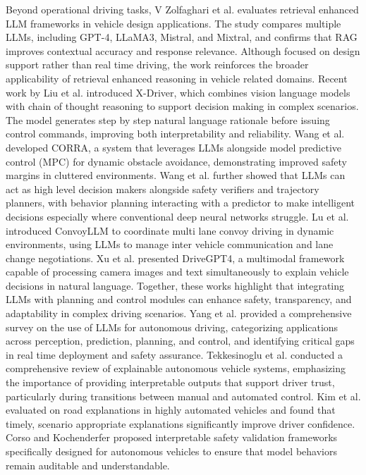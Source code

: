 \documentclass[a4paper,12pt,one side]{report}
\theoremstyle{definition}
\begin{document}
\begin{itemize}
Beyond operational driving tasks, V Zolfaghari et al. \cite{zolfaghari2024adopting} evaluates retrieval enhanced LLM frameworks in vehicle design applications. The study compares multiple LLMs, including GPT-4, LLaMA3, Mistral, and Mixtral, and confirms that RAG improves contextual accuracy and response relevance. Although focused on design support rather than real time driving, the work reinforces the broader applicability of retrieval enhanced reasoning in vehicle related domains.
Recent work by Liu et al. \cite{liu2025x} introduced X-Driver, which combines vision language models with chain of thought reasoning to support decision making in complex scenarios. The model generates step by step natural language rationale before issuing control commands, improving both interpretability and reliability. Wang et al. \cite{wang2025corra} developed CORRA, a system that leverages LLMs alongside model predictive control (MPC) for dynamic obstacle avoidance, demonstrating improved safety margins in cluttered environments. Wang et al. \cite{wang2023empowering} further showed that LLMs can act as high level decision makers alongside safety verifiers and trajectory planners, with behavior planning interacting with a predictor to make intelligent decisions especially where conventional deep neural networks struggle. Lu et al. \cite{lu2025convoyllm} introduced ConvoyLLM to coordinate multi lane convoy driving in dynamic environments, using LLMs to manage inter vehicle communication and lane change negotiations. Xu et al. \cite{xu2024drivegpt4} presented DriveGPT4, a multimodal framework capable of processing camera images and text simultaneously to explain vehicle decisions in natural language. Together, these works highlight that integrating LLMs with planning and control modules can enhance safety, transparency, and adaptability in complex driving scenarios. Yang et al. \cite{yang2023llm4drive} provided a comprehensive survey on the use of LLMs for autonomous driving, categorizing applications across perception, prediction, planning, and control, and identifying critical gaps in real time deployment and safety assurance. Tekkesinoglu et al. \cite{tekkesinoglu2025advancing} conducted a comprehensive review of explainable autonomous vehicle systems, emphasizing the importance of providing interpretable outputs that support driver trust, particularly during transitions between manual and automated control. Kim et al. \cite{kim2023and} evaluated on road explanations in highly automated vehicles and found that timely, scenario appropriate explanations significantly improve driver confidence. Corso and Kochenderfer \cite{corso2020interpretable} proposed interpretable safety validation frameworks specifically designed for autonomous vehicles to ensure that model behaviors remain auditable and understandable.

\end{itemize}
\end{document}
